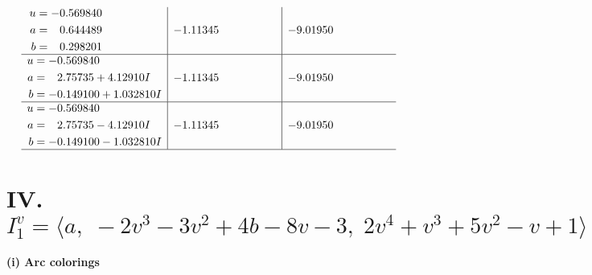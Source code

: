 \documentclass[1p]{elsarticle_modified}
\theoremstyle{definition}
\begin{document}
$$\begin{array}{c|c|c}
\begin{aligned}
u &= -0.569840\phantom{ +0.000000I} \\
a &= \phantom{-}0.644489\phantom{ +0.000000I} \\
b &= \phantom{-}0.298201\phantom{ +0.000000I}\end{aligned}
 & -1.11345\phantom{ +0.000000I} & -9.01950\phantom{ +0.000000I} \\ \hline\begin{aligned}
u &= -0.569840\phantom{ +0.000000I} \\
a &= \phantom{-}2.75735 + 4.12910 I \\
b &= -0.149100 + 1.032810 I\end{aligned}
 & -1.11345\phantom{ +0.000000I} & -9.01950\phantom{ +0.000000I} \\ \hline\begin{aligned}
u &= -0.569840\phantom{ +0.000000I} \\
a &= \phantom{-}2.75735 - 4.12910 I \\
b &= -0.149100 - 1.032810 I\end{aligned}
 & -1.11345\phantom{ +0.000000I} & -9.01950\phantom{ +0.000000I}\\
 \hline 
 \end{array}$$\newpage\newpage\renewcommand{\arraystretch}{1}
\centering \section*{IV. $I^v_{1}= \langle a,\;-2 v^3-3 v^2+4 b-8 v-3,\;2 v^4+v^3+5 v^2- v+1 \rangle$}
\flushleft \textbf{(i) Arc colorings}\\
\end{document}
